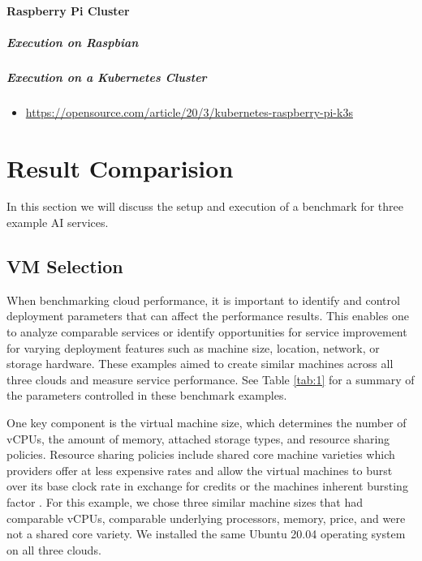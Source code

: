\hypertarget{raspberry-pi-cluster}{%
\paragraph{Raspberry Pi Cluster}\label{raspberry-pi-cluster}}

\hypertarget{execution-on-raspbian}{%
\subparagraph{Execution on Raspbian}\label{execution-on-raspbian}}

\hypertarget{execution-on-a-kubernetes-cluster}{%
\subparagraph{Execution on a Kubernetes
Cluster}\label{execution-on-a-kubernetes-cluster}}

\begin{itemize}
\tightlist
\item
  \url{https://opensource.com/article/20/3/kubernetes-raspberry-pi-k3s}
\end{itemize}

\section{Result Comparision}\label{result-comparision}

In this section we will discuss the setup and execution of a benchmark
for three example AI services.

\subsection{VM Selection}\label{vm-selection}

When benchmarking cloud performance, it is important to identify and
control deployment parameters that can affect the performance results.
This enables one to analyze comparable services or identify
opportunities for service improvement for varying deployment features
such as machine size, location, network, or storage hardware. These
examples aimed to create similar machines across all three clouds and
measure service performance. See Table \ref{tab:1} for a summary of the parameters
controlled in these benchmark examples.

One key component is the virtual machine size, which determines the
number of vCPUs, the amount of memory, attached storage types, and
resource sharing policies. Resource sharing policies include shared
core machine varieties which providers offer at less expensive rates
and allow the virtual machines to burst over its base clock rate in
exchange for credits or the machines inherent bursting factor
\cite{amazon-instances,google-instances}. For this example, we chose
three similar machine sizes that had comparable vCPUs, comparable
underlying processors, memory, price, and were not a shared core
variety. We installed the same Ubuntu 20.04 operating system on all
three clouds.

